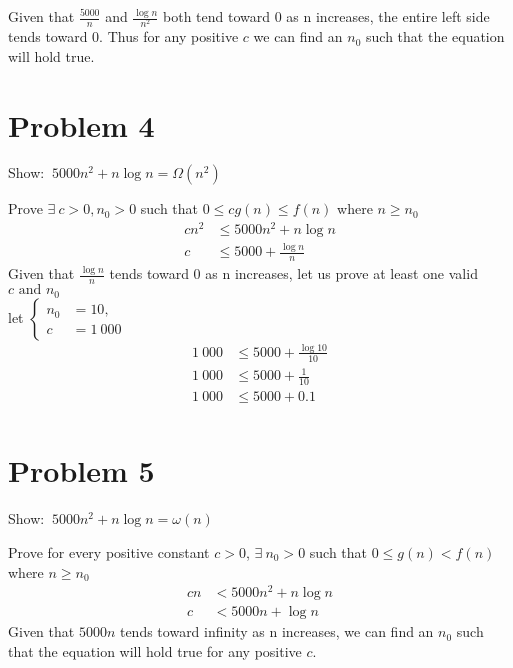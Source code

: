 \documentclass{article}
\begin{document}
Given that \(\frac{5000}{n}\) and \(\frac{\log n}{n^2}\) both tend toward 0 as n increases, the entire left side tends toward 0.
Thus for any positive \(c\) we can find an \(n_0\) such that the equation will hold true.

\section{Problem 4}
\begin{em}
Show: \(\medspace 5000n^2 + n \log n = \Omega(n^2)\) \\
\end{em}
Prove \(\exists \medspace c > 0, n_0 > 0 \) such that \(0 \le c g(n) \le f(n) \) where \(n \ge n_0\) \\
\begin{align}
    c n^2 & \le 5000n^2 + n \log n \\
    c & \le 5000 + \frac{\log n}{n}
\end{align}
Given that \(\frac{\log n}{n}\) tends toward 0 as n increases, let us prove at least one valid \(c \text{ and } n_0\) \\
let
\(\begin{cases}
    n_0 & = 10, \\
    c & = 1~000
\end{cases}\)
\begin{align}
    1~000 & \le 5000 + \frac{\log 10}{10} \\
    1~000 & \le 5000 + \frac{1}{10} \\
    1~000 & \le 5000 + 0.1 \\
\end{align}

\section{Problem 5}
\begin{em}
Show: \(\medspace 5000n^2 + n \log n = \omega(n)\) \\
\end{em}
Prove for every positive constant \(c > 0\), \(\exists \medspace n_0 > 0 \) such that \(0 \le g(n) < f(n) \) where \(n \ge n_0\) \\
\begin{align}
    c n & < 5000n^2 + n \log n \\
    c & < 5000n + \log n
\end{align}
Given that \(5000n\) tends toward infinity as n increases, we can find an \(n_0\) such that the equation will hold true for any positive \(c\).
\end{document}
